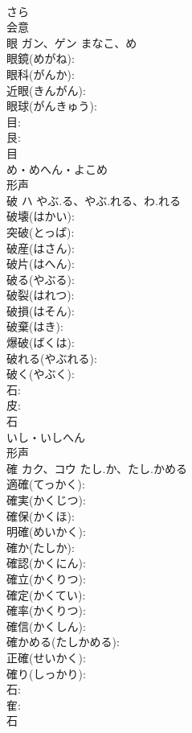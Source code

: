 \documentclass[8pt]{extreport}
\begin{document}
\begin{CJK}{UTF8}{min}
\\	さら	
\\	会意 
\\	眼	ガン、ゲン	まなこ、め		
\\	眼鏡(めがね): 
\\	眼科(がんか): 
\\	近眼(きんがん): 
\\	眼球(がんきゅう): 
\\	目: 
\\	艮: 
\\	目	
\\	め・めへん・よこめ	
\\	形声 
\\	破	ハ	やぶ.る、やぶ.れる、わ.れる		
\\	破壊(はかい): 
\\	突破(とっぱ): 
\\	破産(はさん): 
\\	破片(はへん): 
\\	破る(やぶる): 
\\	破裂(はれつ): 
\\	破損(はそん): 
\\	破棄(はき): 
\\	爆破(ばくは): 
\\	破れる(やぶれる): 
\\	破く(やぶく): 
\\	石: 
\\	皮: 
\\	石	
\\	いし・いしへん	
\\	形声 
\\	確	カク、コウ	たし.か、たし.かめる		
\\	適確(てっかく): 
\\	確実(かくじつ): 
\\	確保(かくほ): 
\\	明確(めいかく): 
\\	確か(たしか): 
\\	確認(かくにん): 
\\	確立(かくりつ): 
\\	確定(かくてい): 
\\	確率(かくりつ): 
\\	確信(かくしん): 
\\	確かめる(たしかめる): 
\\	正確(せいかく): 
\\	確り(しっかり): 
\\	石: 
\\	隺: 
\\	石	

\end{CJK}
\end{document}
